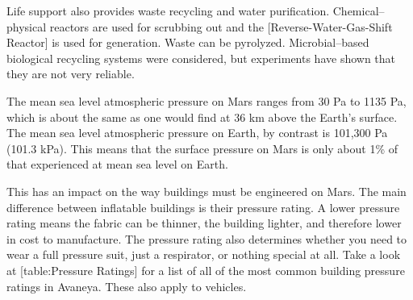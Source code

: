 Life support also provides waste recycling and water purification. Chemical--physical reactors are used for scrubbing  out and the [Reverse-Water-Gas-Shift Reactor] is used for  generation. Waste can be pyrolyzed. Microbial--based biological recycling systems were considered, but experiments have shown that they are not very reliable.

The mean sea level atmospheric pressure on Mars ranges from 30 Pa to 1135 Pa, which is about the same as one would find at 36 km above the Earth's surface. The mean sea level atmospheric pressure on Earth, by contrast is 101,300 Pa (101.3 kPa). This means that the surface pressure on Mars is only about 1\% of that experienced at mean sea level on Earth.

This has an impact on the way buildings must be engineered on Mars. The main difference between inflatable buildings is their pressure rating. A lower pressure rating means the fabric can be thinner, the building lighter, and therefore lower in cost to manufacture. The pressure rating also determines whether you need to wear a full pressure suit, just a respirator, or nothing special at all. Take a look at [table:Pressure Ratings] for a list of all of the most common building pressure ratings in Avaneya. These also apply to vehicles.

